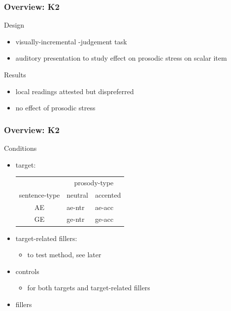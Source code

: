 \documentclass[fleqn,10pt,serif,xcolor=dvipsnames]{beamer}
\renewcommand{\AE}{AE}
\newcommand{\GE}{GE}
\begin{document}
\begin{frame}
  \frametitle{Overview: K2}
  \begin{block}{Design}
    \begin{itemize}
    \item visually-incremental -judgement task
    \item auditory presentation to study effect on prosodic stress on
      scalar item
    \end{itemize}
  \end{block}
  \begin{block}{Results}
    \begin{itemize}
    \item local readings attested but dispreferred
    \item no effect of prosodic stress
    \end{itemize}
  \end{block}
\end{frame}

\begin{frame}
  \frametitle{Overview: K2}
  \begin{block}{Conditions}
    \begin{itemize}
    \item target:
      \begin{center}
        \begin{tabular}{cll}
          & \multicolumn{2}{c}{prosody-type} \\ 
          sentence-type & neutral & accented \\ \midrule
          \AE & ae-ntr & ae-acc \\
          \GE & ge-ntr & ge-acc\\
        \end{tabular}
      \end{center}
    \item target-related fillers:
      \begin{itemize}
      \item to test method, see later
      \end{itemize}
    \item controls
      \begin{itemize}
      \item for both targets and target-related fillers
      \end{itemize}
    \item fillers
    \end{itemize}
  \end{block}
\end{frame}
\end{document}
